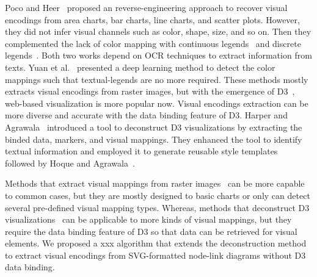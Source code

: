 Poco and Heer~\cite{DBLP:journals/cgf/PocoH17} proposed an reverse-engineering approach to recover visual encodings from area charts, bar charts, line charts, and scatter plots. However, they%
did not infer visual channels such as color, shape, size, and so on.
Then they complemented the lack of color mapping with continuous legends~\cite{DBLP:journals/tvcg/PocoMH18} and discrete legends~\cite{DBLP:conf/sibgrapi/MayhuaNHP18}.
Both two works depend on OCR techniques to extract information from texts.
Yuan et al.~\cite{DBLP:journals/corr/abs-2103-00741} presented a deep learning method to detect the color mappings such that textual-legends are no more required.
These methods mostly extracts visual encodings from raster images, but with the emergence of D3~\cite{DBLP:journals/tvcg/BostockOH11}, web-based visualization is more popular now.
Visual encodings extraction can be more diverse and accurate with the data binding feature of D3.
Harper and Agrawala~\cite{DBLP:conf/uist/HarperA14} introduced a tool to deconstruct D3 visualizations by extracting the binded data, markers, and visual mappings. 
They enhanced the tool to identify textual information and employed it to generate reusable style templates~\cite{DBLP:journals/tvcg/HarperA18} followed by Hoque and Agrawala~\cite{DBLP:journals/tvcg/HoqueA20}. %

Methods that extract visual mappings from raster images~\cite{DBLP:journals/cgf/PocoH17, DBLP:journals/tvcg/PocoMH18, DBLP:conf/sibgrapi/MayhuaNHP18, DBLP:journals/corr/abs-2103-00741} can be more capable to common cases, but they are mostly designed to basic charts or only can detect several pre-defined visual mapping types.
Whereas, methods that deconstruct D3 visualizations~\cite{DBLP:conf/uist/HarperA14, DBLP:journals/tvcg/HarperA18, DBLP:journals/tvcg/HoqueA20} can be applicable to more kinds of visual mappings, but they require the data binding feature of D3 so that data can be retrieved for visual elements. We proposed a {\color{red} xxx } algorithm that extends the deconstruction method to extract visual encodings from SVG-formatted node-link diagrams without D3 data binding.

